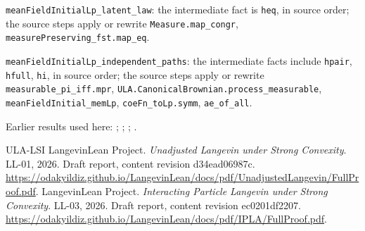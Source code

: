 \documentclass[11pt,a4paper]{article}
\begin{document}
\begin{leanbox}
\texttt{mean\allowbreak{}Field\allowbreak{}Initial\allowbreak{}Lp\_\allowbreak{}latent\_\allowbreak{}law}: the intermediate fact is \texttt{heq}, in source order; the source steps apply or rewrite \texttt{Measure.\allowbreak{}map\_\allowbreak{}congr}, \texttt{measure\allowbreak{}Preserving\_\allowbreak{}fst.\allowbreak{}map\_\allowbreak{}eq}.



\texttt{mean\allowbreak{}Field\allowbreak{}Initial\allowbreak{}Lp\_\allowbreak{}independent\_\allowbreak{}paths}: the intermediate facts include \texttt{hpair}, \texttt{hfull}, \texttt{hi}, in source order; the source steps apply or rewrite \texttt{measurable\_\allowbreak{}pi\_\allowbreak{}iff.\allowbreak{}mpr}, \texttt{ULA.\allowbreak{}Canonical\allowbreak{}Brownian.\allowbreak{}process\_\allowbreak{}measurable}, \texttt{mean\allowbreak{}Field\allowbreak{}Initial\_\allowbreak{}mem\allowbreak{}Lp}, \texttt{coe\allowbreak{}Fn\_\allowbreak{}to\allowbreak{}Lp.\allowbreak{}symm}, \texttt{ae\_\allowbreak{}of\_\allowbreak{}all}.
\end{leanbox}


Earlier results used here: \cite[Section~3.8.11]{LangevinLean2026ULASC}; \cite[Section~3.8.16]{LangevinLean2026ULASC}; \cite[Section~3.8.19]{LangevinLean2026ULASC}; \cite[Section~3.3.1]{LangevinLean2026IPLA}.

\begin{thebibliography}{ULA-LSI}
LangevinLean Project. \emph{Unadjusted Langevin under Strong Convexity}. LL-01, 2026. Draft report, content revision d34ead06987c. \url{https://odakyildiz.github.io/LangevinLean/docs/pdf/UnadjustedLangevin/FullProof.pdf}.
LangevinLean Project. \emph{Interacting Particle Langevin under Strong Convexity}. LL-03, 2026. Draft report, content revision ec0201df2207. \url{https://odakyildiz.github.io/LangevinLean/docs/pdf/IPLA/FullProof.pdf}.
\end{thebibliography}
\end{document}
